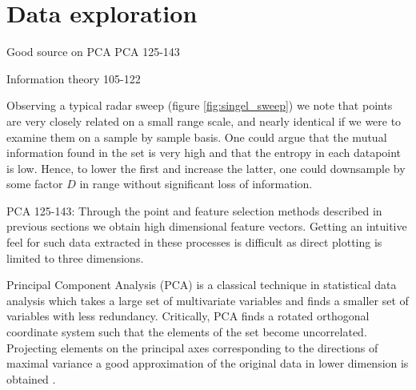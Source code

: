 \section{Data exploration}


Good source on PCA
\cite{hyvasrinen_karhunen_oja_2004}
PCA 125-143

Information theory
105-122

Observing a typical radar sweep (figure \ref{fig:singel_sweep}) we note that points are very closely related on a small range scale, and nearly identical if we were to examine them on a sample by sample basis. One could argue that the mutual information found in the set is very high and that the entropy in each datapoint is low. Hence, to lower the first and increase the latter, one could downsample by some factor $D$ in range without significant loss of information.


PCA 125-143: Through the point and feature selection methods described in previous sections we obtain high dimensional feature vectors. Getting an intuitive feel for such data extracted in these processes is difficult as direct plotting is limited to three dimensions. 

Principal Component Analysis (PCA) is  a classical technique in statistical data analysis which takes a large set of multivariate variables and finds a smaller set of variables with less redundancy. Critically, PCA finds a rotated orthogonal coordinate system such that the elements of the set become uncorrelated. Projecting elements on the principal axes corresponding to the directions of maximal variance a good approximation of the original data in lower dimension is obtained \citep{hyvasrinen_karhunen_oja_2004}.


